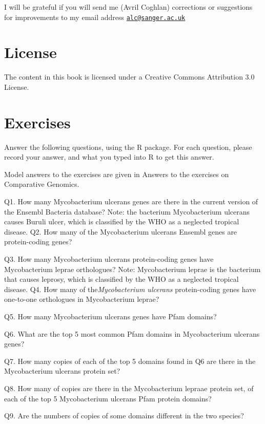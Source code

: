 \documentclass[
]{book}
\begin{document}
I will be grateful if you will send me (Avril Coghlan) corrections or suggestions for improvements to my email address \href{mailto:alc@sanger.ac.uk}{\nolinkurl{alc@sanger.ac.uk}}

\hypertarget{license-2}{%
\chapter{License}\label{license-2}}

The content in this book is licensed under a Creative Commons Attribution 3.0 License.

\hypertarget{exercises-2}{%
\chapter{Exercises}\label{exercises-2}}

Answer the following questions, using the R package. For each question, please record your answer, and what you typed into R to get this answer.

Model answers to the exercises are given in Answers to the exercises on Comparative Genomics.

Q1. How many Mycobacterium ulcerans genes are there in the current version of the Ensembl Bacteria database?
Note: the bacterium Mycobacterium ulcerans causes Buruli ulcer, which is classified by the WHO as a neglected tropical disease.
Q2. How many of the Mycobacterium ulcerans Ensembl genes are protein-coding genes?

Q3. How many Mycobacterium ulcerans protein-coding genes have Mycobacterium leprae orthologues?
Note: Mycobacterium leprae is the bacterium that causes leprosy, which is classified by the WHO as a neglected tropical disease.
Q4. How many of the\emph{Mycobacterium ulcerans} protein-coding genes have one-to-one orthologues in Mycobacterium leprae?

Q5. How many Mycobacterium ulcerans genes have Pfam domains?

Q6. What are the top 5 most common Pfam domains in Mycobacterium ulcerans genes?

Q7. How many copies of each of the top 5 domains found in Q6 are there in the Mycobacterium ulcerans protein set?

Q8. How many of copies are there in the Mycobacterium lepraae protein set, of each of the top 5 Mycobacterium ulcerans Pfam protein domains?

Q9. Are the numbers of copies of some domains different in the two species?
\end{document}
